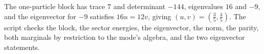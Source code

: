 The one-particle block has trace $7$ and determinant $-144$, eigenvalues $16$ and $-9$, and the eigenvector for $-9$ satisfies $16u = 12v$, giving $(u, v) = (\tfrac35, \tfrac45)$. The script checks the block, the sector energies, the eigenvector, the norm, the parity, both marginals by restriction to the mode's algebra, and the two eigenvector statements.

